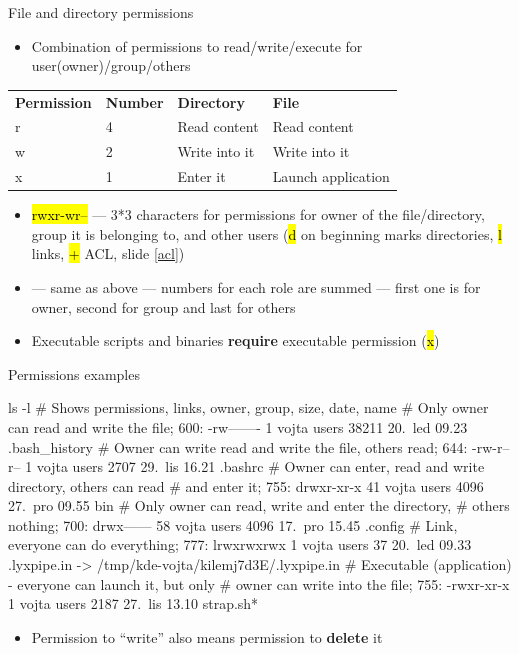 \documentclass[compress, ucs, xelatex, 11pt, xcolor=svgnames,
  hyperref={
    bookmarks=true,
    unicode=true,
    colorlinks=true,
    pdftitle={Linux, command line and MetaCentrum},
    plainpages=false,
    pdfauthor={Vojtech Zeisek},
    pdfsubject={Course about use of Linux command line, writing shell scripts and using MetaCentrum of CESNET},
    pdfcreator={XeLaTeX},
    pdfkeywords={Linux, GNU, BASH, shell, command line, MetaCentrum},
    linkcolor=DarkRed,
    anchorcolor=DarkBlue,
    citecolor=Indigo,
    filecolor=NavyBlue,
    menucolor=DarkMagenta,
    urlcolor=DarkBlue,
    pdftex},
  url={hyphens, lowtilde} %
  ]{beamer}
\renewcommand{\texttt}[1]{\hl{\ttfamily #1}}
\begin{document}
\begin{frame}{File and directory permissions}
  \label{permissions}
  \begin{itemize}
    \item Combination of permissions to read/write/execute for user(owner)/group/others
  \end{itemize}
  \begin{center}
    \begin{tabular}{llll}
      \textbf{Permission} & \textbf{Number} & \textbf{Directory} & \textbf{File}\\
      r & 4 & Read content & Read content\\
      w & 2 & Write into it & Write into it\\
      x & 1 & Enter it & Launch application
    \end{tabular}
  \end{center}
  \begin{itemize}
    \item \texttt{rwxr-wr--} --- 3*3 characters for permissions for owner of the file/directory, group it is belonging to, and other users (\texttt{d} on beginning marks directories, \texttt{l} links, \texttt{+} ACL, slide \ref{acl})
    \item \texttt{764} --- same as above --- numbers for each role are summed --- first one is for owner, second for group and last for others
    \item Executable scripts and binaries \textbf{require} executable permission (\texttt{x})
  \end{itemize}
\end{frame}

\begin{frame}[fragile]{Permissions examples}
  \begin{bashcode}
    ls -l # Shows permissions, links, owner, group, size, date, name
    # Only owner can read and write the file; 600:
    -rw-------   1 vojta users   38211 20. led 09.23 .bash_history
    # Owner can write read and write the file, others read; 644:
    -rw-r--r--   1 vojta users    2707 29. lis 16.21 .bashrc
    # Owner can enter, read and write directory, others can read
    # and enter it; 755:
    drwxr-xr-x  41 vojta users    4096 27. pro 09.55 bin
    # Only owner can read, write and enter the directory,
    # others nothing; 700:
    drwx------  58 vojta users    4096 17. pro 15.45 .config
    # Link, everyone can do everything; 777:
    lrwxrwxrwx   1 vojta users      37 20. led 09.33 .lyxpipe.in ->
      /tmp/kde-vojta/kilemj7d3E/.lyxpipe.in
    # Executable (application) - everyone can launch it, but only
    # owner can write into the file; 755:
    -rwxr-xr-x   1 vojta users    2187 27. lis 13.10 strap.sh*
  \end{bashcode}
  \vfil
  \begin{itemize}
    \item Permission to ``write'' also means permission to \textbf{delete} it
  \end{itemize}
\end{frame}
\end{document}
